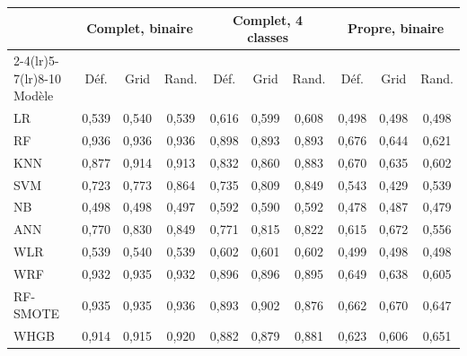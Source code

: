 \begin{tabular}{lccccccccc}
\toprule
& \multicolumn{3}{c}{Complet, binaire} & \multicolumn{3}{c}{Complet, 4 classes} & \multicolumn{3}{c}{Propre, binaire} \\\cmidrule(lr){2-4}\cmidrule(lr){5-7}\cmidrule(lr){8-10}
Modèle & Déf. & Grid & Rand. & Déf. & Grid & Rand. & Déf. & Grid & Rand. \\
\midrule
LR & 0,539 & 0,540 & 0,539 & 0,616 & 0,599 & 0,608 & 0,498 & 0,498 & 0,498 \\
RF & 0,936 & 0,936 & 0,936 & 0,898 & 0,893 & 0,893 & 0,676 & 0,644 & 0,621 \\
KNN & 0,877 & 0,914 & 0,913 & 0,832 & 0,860 & 0,883 & 0,670 & 0,635 & 0,602 \\
SVM & 0,723 & 0,773 & 0,864 & 0,735 & 0,809 & 0,849 & 0,543 & 0,429 & 0,539 \\
NB & 0,498 & 0,498 & 0,497 & 0,592 & 0,590 & 0,592 & 0,478 & 0,487 & 0,479 \\
ANN & 0,770 & 0,830 & 0,849 & 0,771 & 0,815 & 0,822 & 0,615 & 0,672 & 0,556 \\
\midrule
WLR & 0,539 & 0,540 & 0,539 & 0,602 & 0,601 & 0,602 & 0,499 & 0,498 & 0,498 \\
WRF & 0,932 & 0,935 & 0,932 & 0,896 & 0,896 & 0,895 & 0,649 & 0,638 & 0,605 \\
RF-SMOTE & 0,935 & 0,935 & 0,936 & 0,893 & 0,902 & 0,876 & 0,662 & 0,670 & 0,647 \\
WHGB & 0,914 & 0,915 & 0,920 & 0,882 & 0,879 & 0,881 & 0,623 & 0,606 & 0,651 \\
\bottomrule
\end{tabular}